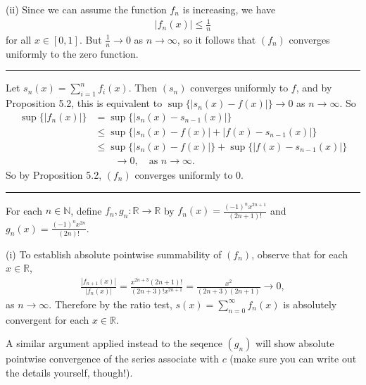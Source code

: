 \documentclass[letterpaper,10pt,english]{jupyterBook}
\begin{document}
\sphinxAtStartPar
(ii) Since we can assume the function \(f_n\) is increasing, we have
\begin{equation*}
\begin{split}
|f_n(x) |\leq \frac{1}{n}
\end{split}
\end{equation*}
\sphinxAtStartPar
for all \(x\in [0,1]\). But \(\frac{1}{n}\rightarrow 0\) as \(n\rightarrow \infty\), so it follows that \((f_n)\) converges uniformly to the zero function.


\bigskip\hrule\bigskip


\sphinxAtStartPar
{\hyperref[\detokenize{Problems:id60}]{}} Let \(s_n(x)=\sum_{i=1}^n f_i(x)\). Then \((s_n)\) converges uniformly to \(f\), and by Proposition 5.2, this is equivalent to \(\sup\{|s_n(x)-f(x)|\}\to 0\) as \(n\to\infty\). So
\begin{align*}
\sup\{|f_n(x)|\}&=\sup\{|s_n(x)-s_{n-1}(x)|\}\\
&\leq \sup \{|s_n(x)-f(x)|+|f(x)-s_{n-1}(x)|\}\\
&\leq \sup \{|s_n(x)-f(x)|\}+\sup\{|f(x)-s_{n-1}(x)|\}\\
&\qquad\to 0, \quad\text{as $n\to\infty$.}
\end{align*}
\sphinxAtStartPar
So by Proposition 5.2, \((f_n)\) converges uniformly to \(0\).


\bigskip\hrule\bigskip


\sphinxAtStartPar
{\hyperref[\detokenize{Problems:id61}]{}} For each \(n\in\mathbb{N}\), define \(f_n,g_n:\mathbb{R}\to\mathbb{R}\) by \(f_n(x)=\frac{(-1)^nx^{2n+1}}{(2n+1)!}\) and \(g_n(x)=\frac{(-1)^nx^{2n}}{(2n)!}\).

\sphinxAtStartPar
(i) To establish absolute pointwise summability of \((f_n)\), observe that for each  \(x\in\mathbb{R}\),
\begin{equation*}
\begin{split}
\frac{|f_{n+1}(x)|}{|f_n(x)|} = \frac{x^{2n+3}(2n+1)!}{(2n+3)!x^{2n+1}} = \frac{x^2}{(2n+3)(2n+1)} \rightarrow 0,
\end{split}
\end{equation*}
\sphinxAtStartPar
as \(n\rightarrow\infty\). Therefore by the ratio test, \(s(x) = \sum_{n=0}^\infty f_n(x)\) is absolutely convergent for each \(x\in\mathbb{R}\).

\sphinxAtStartPar
A similar argument applied instead to the seqence \((g_n)\) will show absolute pointwise convergence of the series associate with \(c\) (make sure you can write out the details yourself, though!).
\end{document}
